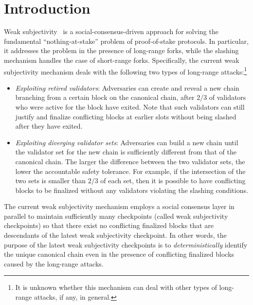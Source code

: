 \section{Introduction}

Weak subjectivity~\cite{weak-subjectivity} is a social-consensus-driven approach for solving the fundamental ``nothing-at-stake'' problem of proof-of-stake protocols.  In particular, it addresses the problem in the presence of long-range forks, while the slashing mechanism handles the case of short-range forks.  Specifically, the current weak subjectivity mechanism deals with the following two types of long-range attacks:\footnote{It is unknown whether this mechanism can deal with other types of long-range attacks, if any, in general.}
\begin{itemize}
\item 
\emph{Exploiting retired validators}: Adversaries can create and reveal a new chain branching from a certain block on the canonical chain, after $2/3$ of validators who were active for the block have exited.  Note that such validators can still justify and finalize conflicting blocks at earlier slots without being slashed after they have exited.
\item
\emph{Exploiting diverging validator sets}: Adversaries can build a new chain until the validator set for the new chain is sufficiently different from that of the canonical chain.  The larger the difference between the two validator sets, the lower the accountable safety tolerance.  For example, if the intersection of the two sets is smaller than $2/3$ of each set, then it is possible to have conflicting blocks to be finalized without any validators violating the slashing conditions.
\end{itemize}
The current weak subjectivity mechanism employs a social consensus layer in parallel to maintain sufficiently many checkpoints (called weak subjectivity checkpoints) so that there exist no conflicting finalized blocks that are descendants of the latest weak subjectivity checkpoint.  In other words, the purpose of the latest weak subjectivity checkpoints is to \emph{deterministically} identify the unique canonical chain even in the presence of conflicting finalized blocks caused by the long-range attacks.
